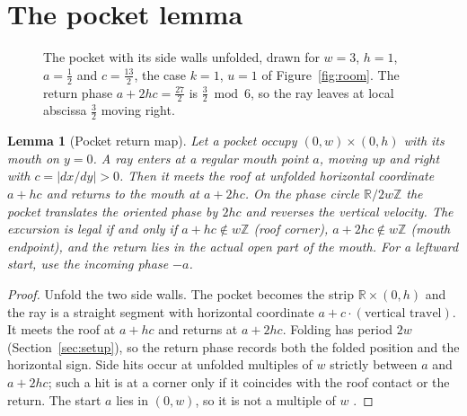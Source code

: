 \documentclass[11pt]{article}
\newtheorem{lemma}{Lemma}
\theoremstyle{definition}
\theoremstyle{remark}
\newcommand{\Z}{\mathbb Z}
\newcommand{\R}{\mathbb R}
\begin{document}
\section{The pocket lemma}\label{sec:pocket}
\begin{figure}[t]
\centering
{}
\caption{The pocket with its side walls unfolded, drawn for $w=3$, $h=1$,
$a=\tfrac12$ and $c=\tfrac{13}{2}$, the case $k=1$, $u=1$ of
Figure~\ref{fig:room}. The return phase $a+2hc=\tfrac{27}{2}$ is
$\tfrac32\bmod 6$, so the ray leaves at local abscissa $\tfrac32$ moving right.}
\label{fig:unfold}
\end{figure}

\begin{lemma}[Pocket return map]\label{lem:pocket}
Let a pocket occupy $(0,w)\times(0,h)$ with its mouth on $y=0$. A ray enters at
a regular mouth point $a$, moving up and right with $c=|dx/dy|>0$. Then it meets
the roof at unfolded horizontal coordinate $a+hc$ and returns to the mouth at
$a+2hc$. On the phase circle $\R/2w\Z$ the pocket translates the oriented phase
by $2hc$ and reverses the vertical velocity. The excursion is legal if and only
if $a+hc\notin w\Z$ (roof corner), $a+2hc\notin w\Z$ (mouth endpoint), and the
return lies in the actual open part of the mouth. For a leftward start, use the
incoming phase $-a$.
\end{lemma}

\begin{proof}
Unfold the two side walls. The pocket becomes the strip $\R\times(0,h)$ and the
ray is a straight segment with horizontal coordinate $a+c\cdot(\text{vertical
travel})$. It meets the roof at $a+hc$ and returns at $a+2hc$. Folding has
period $2w$ (Section~\ref{sec:setup}), so the return phase records both the
folded position and the horizontal sign. Side hits occur at unfolded multiples
of $w$ strictly between $a$ and $a+2hc$; such a hit is at a corner only if it
coincides with the roof contact or the return. The start $a$ lies in $(0,w)$,
so it is not a multiple of $w$ \cite{R2,d201}.
\end{proof}
\end{document}
